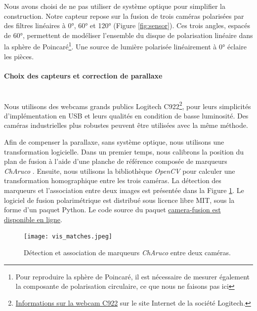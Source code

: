 Nous avons choisi de ne pas utiliser de système optique pour simplifier la construction.
Notre capteur repose sur la fusion de trois caméras polarisées par des filtres linéaires à 0°, 60° et 120° (Figure \ref{fig:sensor}).
Ces trois angles, espacés de 60°, permettent de modéliser l'ensemble du disque de polarisation linéaire dans la sphère de Poincaré\footnote{Pour reproduire la sphère de Poincaré, il est nécessaire de mesurer également la composante de polarisation circulaire, ce que nous ne faisons pas ici}.
Une source de lumière polarisée linéairement à 0° éclaire les pièces.


\paragraph{Choix des capteurs et correction de parallaxe}\mbox{} \\
Nous utilisons des webcams grands publics Logitech C922\footnote{\href{https://www.logitech.fr/fr-fr/product/c922-pro-stream-webcam}{Informations sur la webcam C922} sur le site Internet de la société Logitech.}, pour leurs simplicités d'implémentation en USB et leurs qualités en condition de basse luminosité.
Des caméras industrielles plus robustes peuvent être utilisées avec la même méthode.

Afin de compenser la parallaxe, sans système optique, nous utilisons une transformation logicielle.
Dans un premier temps, nous calibrons la position du plan de fusion à l'aide d'une planche de référence composée de marqueurs \textit{ChAruco} \cite{garrido-jurado_automatic_2014, garrido-jurado_generation_2016, romero-ramirez_speeded_2018}.
Ensuite, nous utilisons la bibliothèque \textit{OpenCV} \cite{opencv_library} pour calculer une transformation homographique entre les trois caméras.
La détection des marqueurs et l'association entre deux images est présentée dans la Figure \ref{fig:mecaruco}.
Le logiciel de fusion polarimétrique est distribué sous licence libre MIT, sous la forme d'un paquet Python.
Le code source du paquet \href{https://github.com/a1rb4Ck/camera-fusion}{camera-fusion est disponible en ligne}.

\begin{figure}[thb]
	\centering
	\texttt{[image: vis\_matches.jpeg]}
	\caption{Détection et association de marqueurs \textit{ChAruco} entre deux caméras.}
	\label{fig:mecaruco}
\end{figure}

